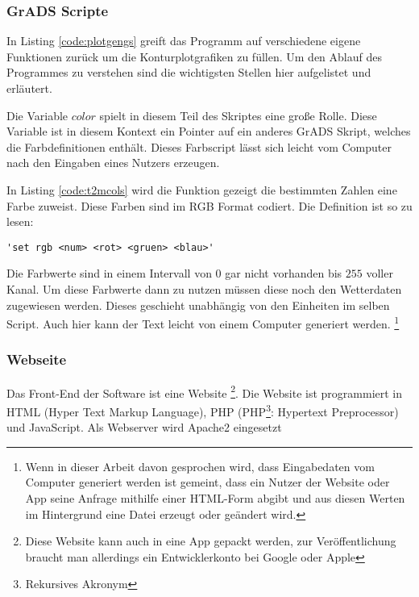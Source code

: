 \subsubsection*{GrADS Scripte}


In Listing \ref{code:plotgengs} greift das Programm auf verschiedene eigene
Funktionen zurück um die Konturplotgrafiken zu füllen.
Um den Ablauf des Programmes zu verstehen sind die wichtigsten Stellen hier aufgelistet und erläutert.

Die Variable $color$ spielt in diesem Teil des Skriptes eine große Rolle.
Diese Variable ist in diesem Kontext ein Pointer auf ein anderes GrADS Skript,
welches die Farbdefinitionen enthält.
Dieses Farbscript lässt sich leicht vom Computer nach den Eingaben eines Nutzers erzeugen.

In Listing \ref{code:t2mcols} wird die Funktion gezeigt die bestimmten Zahlen eine Farbe zuweist.
Diese Farben sind im RGB Format codiert.
Die Definition ist so zu lesen:

\begin{lstlisting}[language=grads]
	'set rgb <num> <rot> <gruen> <blau>'
\end{lstlisting}

Die Farbwerte sind in einem Intervall von $0$ gar nicht vorhanden bis $255$ voller Kanal.
Um diese Farbwerte dann zu nutzen müssen diese noch den Wetterdaten zugewiesen werden.
Dieses geschieht unabhängig von den Einheiten im selben Script.
Auch hier kann der Text leicht von einem Computer generiert werden.
\footnote{Wenn in dieser Arbeit davon gesprochen wird, dass Eingabedaten vom Computer
generiert werden ist gemeint,
dass ein Nutzer der Website oder App seine Anfrage mithilfe einer HTML-Form abgibt
und aus diesen Werten im Hintergrund eine Datei erzeugt oder geändert wird.}


\subsubsection*{Webseite}
Das Front-End der Software ist eine Website
\footnote{Diese Website kann auch in eine App gepackt werden,
zur Veröffentlichung braucht man allerdings ein Entwicklerkonto bei Google oder Apple}.
Die Website ist programmiert in HTML (Hyper Text Markup Language),
PHP (PHP\footnote{Rekursives Akronym}: Hypertext Preprocessor) und JavaScript.
Als Webserver wird Apache2 eingesetzt \cite{php} \cite{apache} \\

